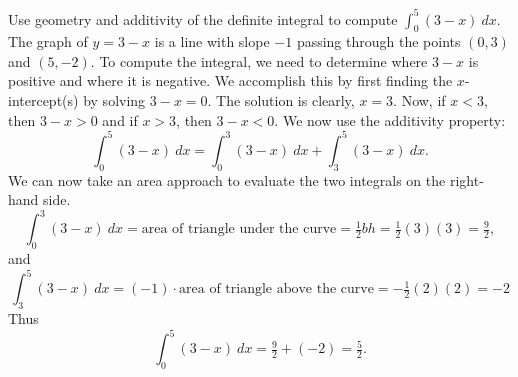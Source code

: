 \documentclass{ximera}
\begin{document}
\begin{example} Use geometry and additivity of the definite integral to compute  
$\displaystyle{\int_0^5  (3-x)  \ dx}$.
The graph of $y = 3-x$ is a line with slope $-1$ passing through the points $(0,3)$ and $(5,-2)$. To compute the integral,
we need to determine where $3-x$ is positive and where it is negative. We accomplish this by first finding the $x$-intercept(s)
by solving $3-x = 0$.  The solution is clearly, $x = 3$.  Now, if $x < 3$, then $3 - x >0$ and if
$x >3$, then $3-x <0$.
We now use the additivity property:
\[\int_0^5 (3-x) \ dx = \int_0^3 (3-x) \ dx  + \int_3^5 (3-x) \ dx.\]
We can now take an area approach to evaluate the two integrals on the right-hand side.
\[\int_0^3 (3-x) \ dx = \text{area of triangle under the curve} = \tfrac12bh = \tfrac12(3)(3) = \tfrac92,\]
and
\[\int_3^5 (3-x) \ dx = (-1)\cdot\text{area of triangle above the curve} = -\tfrac12(2)(2) = -2\]
Thus
\[\int_0^5 (3-x) \ dx = \tfrac92  + (-2) = \tfrac52.\]


\begin{image}
\end{image}

\end{example}
\end{document}
